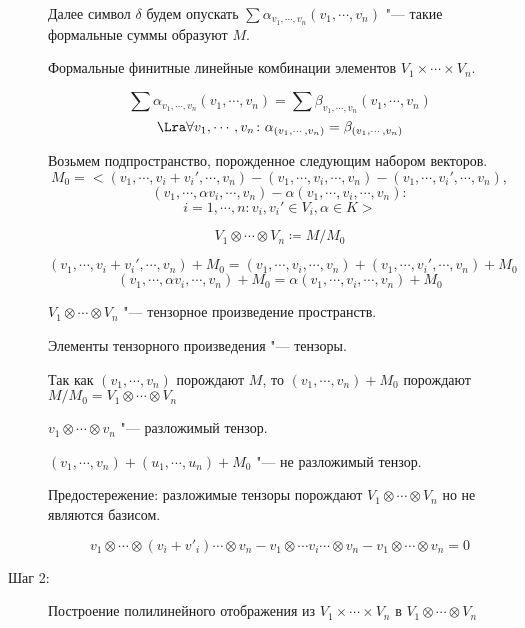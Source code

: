 \begin{description}
    Далее символ $\delta$ будем опускать $\sum \alpha_{v_1, \cdots, v_n}(v_1, \cdots, v_n)$ "--- такие формальные суммы образуют $M$.

    Формальные финитные линейные комбинации элементов $V_1 \times \cdots \times V_n$.

    $$\sum \alpha_{v_1, \cdots, v_n}(v_1, \cdots, v_n) = \sum \beta_{v_1, \cdots, v_n}(v_1, \cdots, v_n)$$ 
    $$\Lra \forall v_1, \cdots, v_n \colon \alpha_{(v_1, \cdots,  v_n)} = \beta_{(v_1, \cdots, v_n)}$$

    Возьмем подпространство, порожденное следующим набором векторов. 
    $$M_0 = <(v_1, \cdots, v_i + v_i', \cdots, v_n) - (v_1, \cdots, v_i, \cdots, v_n) - (v_1, \cdots, v_i', \cdots, v_n), $$
    $$       (v_1, \cdots, \alpha v_i, \cdots, v_n) - \alpha(v_1,\cdots, v_i, \cdots, v_n)\colon  $$
    $$ i = 1, \cdots, n \colon v_i, v_i' \in V_i, \alpha \in K>$$

    $$V_1 \otimes \cdots \otimes V_n \coloneqq M/M_0$$
    
    \begin{Rem}
    $$(v_1, \cdots, v_i + v_i', \cdots, v_n) + M_0 = (v_1, \cdots, v_i, \cdots, v_n) + (v_1, \cdots, v_i',\cdots, v_n) + M_0$$
    $$(v_1, \cdots, \alpha v_i, \cdots, v_n) + M_0 = \alpha(v_1,\cdots, v_i, \cdots, v_n) + M_0$$
    \end{Rem}
    \begin{Def}
    $V_1 \otimes \cdots \otimes V_n$ "--- тензорное произведение пространств. 

    Элементы тензорного произведения "--- тензоры. 

    Так как  $(v_1, \cdots, v_n)$ порождают $M$,
    то $(v_1,\cdots, v_n) + M_0$ порождают $M/M_0 = V_1 \otimes \cdots \otimes V_n$
    
    $v_1 \otimes \cdots \otimes v_n$ "--- разложимый тензор. 
    \end{Def}
   
    $(v_1, \cdots, v_n) + (u_1, \cdots, u_n) + M_0$ "--- не разложимый тензор. 

    Предостережение: разложимые тензоры порождают $V_1 \otimes \cdots \otimes V_n$ 
    но не являются базисом.

    $$v_1 \otimes \cdots \otimes (v_i + v'_i) \cdots \otimes v_n - v_1 \otimes \cdots v_i \cdots \otimes v_n - v_1 \otimes \cdots \otimes v_n = 0$$
    \item[Шаг 2:] Построение полилинейного отображения из $V_1 \times \cdots \times V_n$ в $V_1 \otimes \cdots \otimes V_n$


\end{description}

